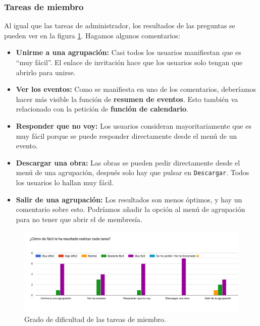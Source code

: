 \subsubsection{Tareas de miembro}

Al igual que las tareas de administrador, los resultados de las preguntas se pueden ver en la figura \ref{fig:graficoTareasMiembro}. Hagamos algunos comentarios:

\begin{itemize}
    \item \textbf{Unirme a una agrupación:} Casi todos los usuarios manifiestan que es ``muy fácil''. El enlace de invitación hace que los usuarios solo tengan que abrirlo para unirse.
    \item \textbf{Ver los eventos:} Como se manifiesta en uno de los comentarios, deberíamos hacer más visible la función de \textbf{resumen de eventos}. Esto también va relacionado con la petición de \textbf{función de calendario}.
    \item \textbf{Responder que no voy:} Los usuarios consideran mayoritariamente que es muy fácil porque se puede responder directamente desde el menú de un evento.
    \item \textbf{Descargar una obra:} Las obras se pueden pedir directamente desde el menú de una agrupación, después solo hay que pulsar en \texttt{Descargar}. Todos los usuarios lo hallan muy fácil.
    \item \textbf{Salir de una agrupación:} Los resultados son menos óptimos, y hay un comentario sobre esto. Podríamos añadir la opción al menú de agrupación para no tener que abrir el de membresía.
\end{itemize}

\begin{figure}[h]
\centering
\includegraphics[width=\textwidth]{imagenes/pruebas/tareas_miembro.png}
\caption{Grado de dificultad de las tareas de miembro.}
\label{fig:graficoTareasMiembro}
\end{figure}

